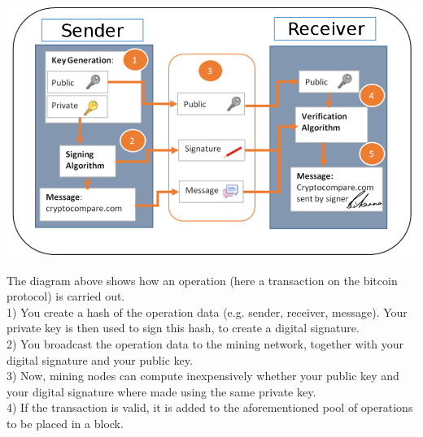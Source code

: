 \begin{center}
   \includegraphics[scale = 0.35]{diagrams/transaction_diagram.png}
\end{center}

The diagram above shows how an operation (here a transaction on the bitcoin protocol) is carried out.\\
1) You create a hash of the operation data (e.g. sender, receiver, message). Your private key is then used to sign this hash,
to create a digital signature.\\
2) You broadcast the operation data to the mining network, together with your digital signature and your public key.\\
3) Now, mining nodes can compute inexpensively whether your public key and your digital signature where made using the same private key.\\
4) If the transaction is valid, it is added to the aforementioned pool of operations to be placed in a block.
